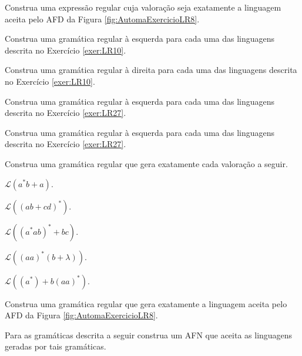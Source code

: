\begin{questao}\label{exer:EGR43}
	Construa uma expressão regular cuja valoração seja exatamente a linguagem aceita pelo AFD da Figura \ref{fig:AutomaExercicioLR8}. 
\end{questao}

\begin{questao}\label{exer:EGR44}
	Construa uma gramática regular à esquerda para cada uma das linguagens descrita no Exercício \ref{exer:LR10}.
\end{questao}

\begin{questao}\label{exer:EGR45}
	Construa uma gramática regular à direita para cada uma das linguagens descrita no Exercício \ref{exer:LR10}.
\end{questao}

\begin{questao}\label{exer:EGR46}
	Construa uma gramática regular à esquerda para cada uma das linguagens descrita no Exercício \ref{exer:LR27}.
\end{questao}

\begin{questao}\label{exer:EGR47}
	Construa uma gramática regular à esquerda para cada uma das linguagens descrita no Exercício \ref{exer:LR27}.
\end{questao}

\begin{questao}\label{exer:EGR48}
	Construa uma gramática regular que gera exatamente cada valoração a seguir.
\end{questao}

\begin{exerList}
	\item $\mathcal{L}(a^*b + a)$.
	\item $\mathcal{L}((ab + cd)^*)$.
	\item $\mathcal{L}((a^*ab)^* + bc)$.
	\item $\mathcal{L}((aa)^* (b + \lambda))$.
	\item $\mathcal{L}((a^*) + b(aa)^*)$.
\end{exerList}

\begin{questao}\label{exer:EGR49}
	Construa uma gramática regular que gera exatamente a linguagem aceita pelo AFD da Figura \ref{fig:AutomaExercicioLR8}. 
\end{questao}

\begin{questao}\label{exer:EGR50}
	Para as gramáticas descrita a seguir construa um AFN que aceita as linguagens geradas por tais gramáticas. 
\end{questao}

